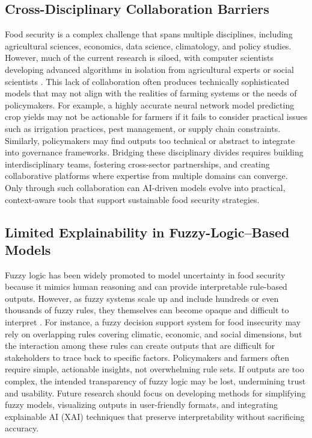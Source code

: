 \documentclass[preprint,12pt]{elsarticle}
\begin{document}
	\subsection{Cross-Disciplinary Collaboration Barriers}
	
	Food security is a complex challenge that spans multiple disciplines,
	including agricultural sciences, economics, data science, climatology,
	and policy studies. However, much of the current research is siloed,
	with computer scientists developing advanced algorithms in isolation
	from agricultural experts or social scientists \cite{ref86}. This lack of
	collaboration often produces technically sophisticated models that may
	not align with the realities of farming systems or the needs of
	policymakers. For example, a highly accurate neural network model
	predicting crop yields may not be actionable for farmers if it fails to
	consider practical issues such as irrigation practices, pest management,
	or supply chain constraints. Similarly, policymakers may find outputs
	too technical or abstract to integrate into governance frameworks.
	Bridging these disciplinary divides requires building interdisciplinary
	teams, fostering cross-sector partnerships, and creating collaborative
	platforms where expertise from multiple domains can converge. Only
	through such collaboration can AI-driven models evolve into practical,
	context-aware tools that support sustainable food security strategies.
	
	\subsection{Limited Explainability in Fuzzy-Logic--Based Models}
	
	Fuzzy logic has been widely promoted to model uncertainty in food
	security because it mimics human reasoning and can provide interpretable
	rule-based outputs. However, as fuzzy systems scale up and include
	hundreds or even thousands of fuzzy rules, they themselves can become
	opaque and difficult to interpret \cite{ref87}. For instance, a fuzzy decision
	support system for food insecurity may rely on overlapping rules
	covering climatic, economic, and social dimensions, but the interaction
	among these rules can create outputs that are difficult for stakeholders
	to trace back to specific factors. Policymakers and farmers often
	require simple, actionable insights, not overwhelming rule sets. If
	outputs are too complex, the intended transparency of fuzzy logic may be
	lost, undermining trust and usability. Future research should focus on
	developing methods for simplifying fuzzy models, visualizing outputs in
	user-friendly formats, and integrating explainable AI (XAI) techniques
	that preserve interpretability without sacrificing accuracy.
	
\end{document}
